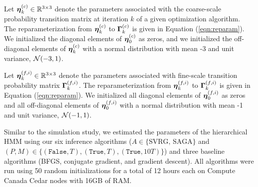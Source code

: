 Let $\boldsymbol{\eta}_k^{(c)} \in \mathbb{R}^{3 \times 3}$ denote the parameters associated with the coarse-scale probability transition matrix at iteration $k$ of a given optimization algorithm. The reparameterization from $\boldsymbol{\eta}_k^{(c)}$ to $\boldsymbol{\Gamma}_k^{(c)}$ is given in Equation (\ref{eqn:reparam}). We initialized the diagonal elements of $\boldsymbol{\eta}_0^{(c)}$ as zeros, and we initialized the off-diagonal elements of $\boldsymbol{\eta}_k^{(c)}$ with a normal distribution with mean -3 and unit variance, $\mathcal{N}(-3,1)$.

Let $\boldsymbol{\eta}_k^{(f,i)} \in \mathbb{R}^{3 \times 3}$ denote the parameters associated with fine-scale transition probability matrix $\boldsymbol{\Gamma}_k^{(f,i)}$. The reparameterization from $\boldsymbol{\eta}_k^{(f,i)}$ to $\boldsymbol{\Gamma}_k^{(f,i)}$ is given in Equation (\ref{eqn:reparam}). We initialized all diagonal elements of $\boldsymbol{\eta}_0^{(f,i)}$ as zeros and all off-diagonal elements of $\boldsymbol{\eta}_0^{(f,i)}$ with a normal distribution with mean -1 and unit variance, $\mathcal{N}(-1,1)$.

%
%
Similar to the simulation study, we estimated the parameters of the hierarchical HMM using our six inference algorithms ($A \in \{\text{SVRG, SAGA}\}$ and $(P,M) \in \{(\texttt{False},T),(\texttt{True},T),(\texttt{True},10T)\}$) and three baseline algorithms (BFGS, conjugate gradient, and gradient descent).
%
All algorithms were run using 50 random initializations for a total of 12 hours each on Compute Canada Cedar nodes with 16GB of RAM.

